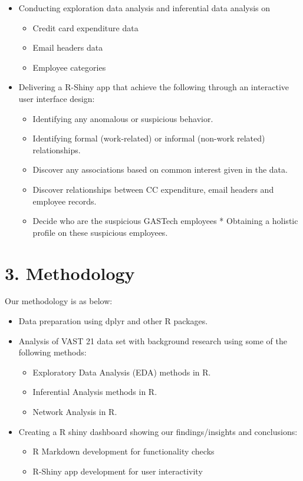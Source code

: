 \documentclass[
]{article}
\providecommand{\tightlist}{%
  \setlength{\itemsep}{0pt}\setlength{\parskip}{0pt}}
\begin{document}
\begin{itemize}
\tightlist
\item
  Conducting exploration data analysis and inferential data analysis on

  \begin{itemize}
  \tightlist
  \item
    Credit card expenditure data
  \item
    Email headers data
  \item
    Employee categories
  \end{itemize}
\item
  Delivering a R-Shiny app that achieve the following through an interactive user interface design:

  \begin{itemize}
  \tightlist
  \item
    Identifying any anomalous or suspicious behavior.
  \item
    Identifying formal (work-related) or informal (non-work related) relationships.\\
  \item
    Discover any associations based on common interest given in the data.\\
  \item
    Discover relationships between CC expenditure, email headers and employee records.
  \item
    Decide who are the suspicious GASTech employees * Obtaining a holistic profile on these suspicious employees.
  \end{itemize}
\end{itemize}

\hypertarget{methodology}{%
\section{3. Methodology}\label{methodology}}

Our methodology is as below:

\begin{itemize}
\item
  Data preparation using dplyr and other R packages.
\item
  Analysis of VAST 21 data set with background research using some of the following methods:

  \begin{itemize}
  \tightlist
  \item
    Exploratory Data Analysis (EDA) methods in R.
  \item
    Inferential Analysis methods in R.
  \item
    Network Analysis in R.
  \end{itemize}
\item
  Creating a R shiny dashboard showing our findings/insights and conclusions:

  \begin{itemize}
  \tightlist
  \item
    R Markdown development for functionality checks
  \item
    R-Shiny app development for user interactivity
  \end{itemize}
\end{itemize}
\end{document}
